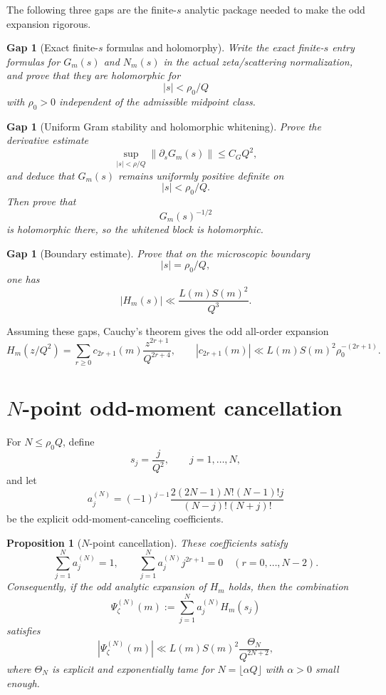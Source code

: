 \documentclass[11pt]{article}
\theoremstyle{plain}
\newtheorem{proposition}[theorem]{Proposition}
\newtheorem{gaptheorem}[theorem]{Gap}
\theoremstyle{definition}
\newcommand{\zetaSide}{\zeta}
\newcommand{\Qloc}{Q}
\newcommand{\norm}[1]{\left\lVert #1\right\rVert}
\newcommand{\abs}[1]{\left\lvert #1\right\rvert}
\begin{document}
The following three gaps are the finite-$s$ analytic package needed to make the odd expansion rigorous.

\begin{gaptheorem}[Exact finite-$s$ formulas and holomorphy]
\label{gap:finite-s-formulas}
Write the exact finite-$s$ entry formulas for $G_m(s)$ and $N_m(s)$ in the actual zeta/scattering normalization, and prove that they are holomorphic for
\[
|s|<\rho_0/\Qloc
\]
with $\rho_0>0$ independent of the admissible midpoint class.
\end{gaptheorem}

\begin{gaptheorem}[Uniform Gram stability and holomorphic whitening]
\label{gap:gram-stability}
Prove the derivative estimate
\[
\sup_{|s|<\rho/\Qloc}\norm{\partial_s G_m(s)}\le C_G\Qloc^2,
\]
and deduce that $G_m(s)$ remains uniformly positive definite on
\[
|s|<\rho_0/\Qloc.
\]
Then prove that
\[
G_m(s)^{-1/2}
\]
is holomorphic there, so the whitened block is holomorphic.
\end{gaptheorem}

\begin{gaptheorem}[Boundary estimate]
\label{gap:boundary}
Prove that on the microscopic boundary
\[
|s|=\rho_0/\Qloc,
\]
one has
\[
\abs{H_m(s)}\ll \frac{L(m)S(m)^2}{\Qloc^3}.
\]
\end{gaptheorem}

Assuming these gaps, Cauchy's theorem gives the odd all-order expansion
\[
H_m(z/\Qloc^2)=\sum_{r\ge 0} c_{2r+1}(m)\frac{z^{2r+1}}{\Qloc^{2r+4}},
\qquad
\abs{c_{2r+1}(m)}\ll L(m)S(m)^2\rho_0^{-(2r+1)}.
\]

\section{$N$-point odd-moment cancellation}

For $N\le \rho_0\Qloc$, define
\[
s_j=\frac{j}{\Qloc^2},\qquad j=1,\dots,N,
\]
and let
\[
a_j^{(N)}
=
(-1)^{j-1}
\frac{2(2N-1)N!(N-1)!j}{(N-j)!(N+j)!}
\]
be the explicit odd-moment-canceling coefficients.

\begin{proposition}[$N$-point cancellation]
These coefficients satisfy
\[
\sum_{j=1}^N a_j^{(N)}=1,
\qquad
\sum_{j=1}^N a_j^{(N)}j^{2r+1}=0
\quad (r=0,\dots,N-2).
\]
Consequently, if the odd analytic expansion of $H_m$ holds, then the combination
\[
\Psi_{\zetaSide}^{(N)}(m):=\sum_{j=1}^N a_j^{(N)}H_m(s_j)
\]
satisfies
\[
\abs{\Psi_{\zetaSide}^{(N)}(m)}
\ll
L(m)S(m)^2\frac{\Theta_N}{\Qloc^{2N+2}},
\]
where $\Theta_N$ is explicit and exponentially tame for $N=\lfloor \alpha \Qloc\rfloor$ with $\alpha>0$ small enough.
\end{proposition}
\end{document}
